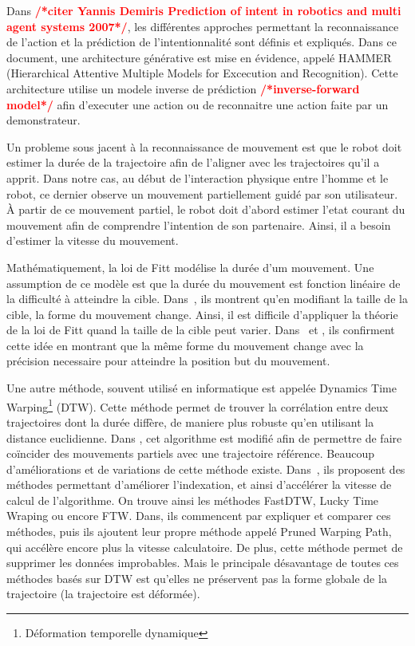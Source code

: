 \documentclass[utf8]{frontiersSCNS} %
\newcommand{\todo}[1]{\textcolor{red}{\textbf{/*#1*/}}}
\begin{document}
Dans \todo{citer Yannis Demiris Prediction of intent in robotics and multi agent systems 2007}, les différentes approches permettant la reconnaissance de l'action et la prédiction de l'intentionnalité sont définis et expliqués. Dans ce document, une architecture générative est mise en évidence, appelé HAMMER (Hierarchical Attentive Multiple Models for Excecution and Recognition). Cette architecture utilise un modele inverse de prédiction \todo{inverse-forward model} afin d'executer une action ou de reconnaitre une action faite par un demonstrateur.

Un probleme sous jacent à la reconnaissance de mouvement est que le robot doit estimer la durée de la trajectoire afin de l'aligner avec les trajectoires qu'il a apprit. Dans notre cas, au début de l'interaction physique entre l'homme et le robot, ce dernier observe un mouvement partiellement guidé par son utilisateur. À partir de ce mouvement partiel, le robot doit d'abord estimer l'etat courant du mouvement afin de comprendre l'intention de son partenaire. Ainsi, il a besoin d'estimer la vitesse du mouvement.

Mathématiquement, la loi de Fitt modélise la durée d'um mouvement. Une assumption de ce modèle est que la durée du mouvement est fonction linéaire de la difficulté à atteindre la cible\cite{fitts1992information}. Dans~\cite{langolf1976investigation}, ils montrent qu'en modifiant la taille de la cible, la forme du mouvement change. Ainsi, il est difficile d'appliquer la théorie de la loi de Fitt quand la taille de la cible peut varier. Dans~\cite{langolf1976investigation} et \cite{soechting1984effect}, ils confirment cette idée en montrant que la même forme du mouvement change avec la précision necessaire pour atteindre la position but du mouvement.

Une autre méthode, souvent utilisé en informatique est appelée Dynamics Time Warping\footnote{Déformation temporelle dynamique} (DTW). 
Cette méthode permet de trouver la corrélation entre deux trajectoires dont la durée diffère, de maniere plus robuste qu'en utilisant la distance euclidienne. Dans \cite{amor2014interaction}, cet algorithme est modifié afin de permettre de faire coïncider des mouvements partiels avec une trajectoire référence.
Beaucoup d'améliorations et de variations de cette méthode existe. Dans~\cite{keogh2002exact}, 
ils proposent des méthodes permettant d'améliorer l'indexation, et ainsi d’accélérer la vitesse de calcul de l'algorithme. On trouve ainsi les méthodes FastDTW, Lucky Time Wraping ou encore FTW.  Dans\cite{silva2016speeding}, ils commencent par expliquer et comparer ces méthodes, puis ils ajoutent leur propre méthode appelé Pruned Warping Path, qui accélère encore plus la vitesse calculatoire. De plus, cette méthode permet de supprimer les données improbables. Mais le principale désavantage de toutes ces méthodes basés sur DTW est qu'elles ne préservent pas la forme globale de la trajectoire (la trajectoire est déformée).
\end{document}
